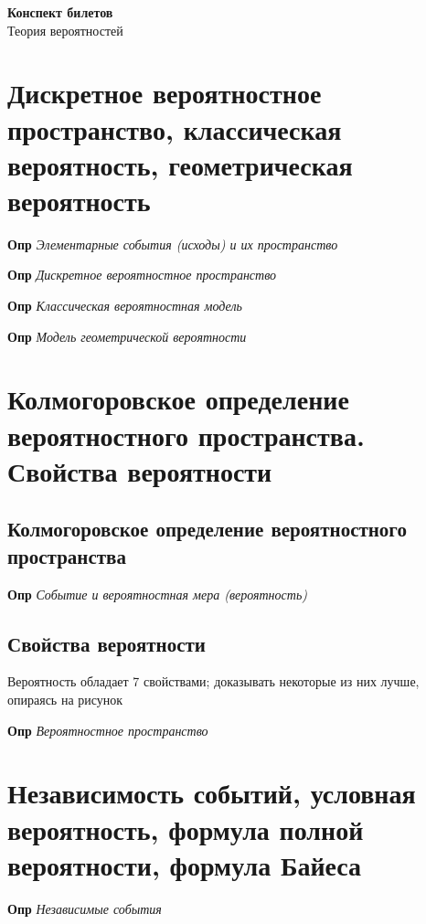 \documentclass[a4paper, 14pt]{article}
\begin{document}
{\huge
    \begin{center}
    {\textbf{Конспект билетов}}
        \\
        Теория вероятностей
    \end{center}
}
    \tableofcontents \newpage
    
    \section{Дискретное вероятностное пространство, классическая вероятность, геометрическая вероятность}
    
    \textbf{Опр} \textit{Элементарные события (исходы) и их пространство}
    
    \textbf{Опр} \textit{Дискретное вероятностное пространство}
    
    \textbf{Опр} \textit{Классическая вероятностная модель}
    
    \textbf{Опр} \textit{Модель геометрической вероятности}
    
    \section{Колмогоровское определение вероятностного пространства.
    Свойства вероятности}
    
    \subsection{Колмогоровское определение вероятностного пространства}
    
    \textbf{Опр} \textit{Событие и вероятностная мера (вероятность)}
    
    \subsection{Свойства вероятности}
    
    Вероятность обладает 7 свойствами; доказывать некоторые из них лучше, опираясь на рисунок
    
    \textbf{Опр} \textit{Вероятностное пространство}
    
    \section{Независимость событий, условная вероятность, формула полной вероятности, формула Байеса}
    
    \textbf{Опр} \textit{Независимые события}
    
\end{document}
